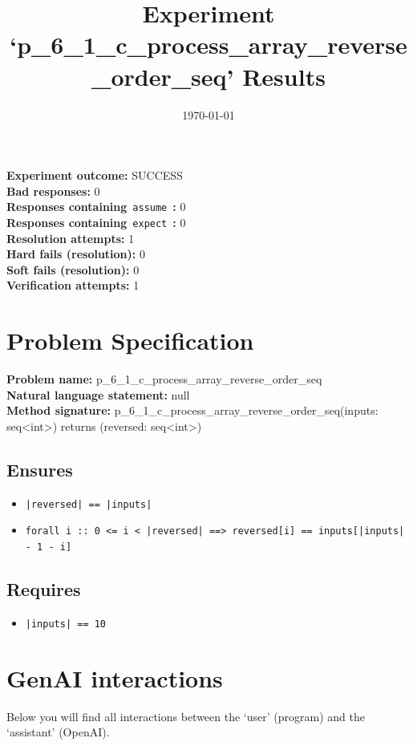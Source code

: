 \documentclass{article}
\begin{document}
\title{Experiment `p\_6\_1\_c\_process\_array\_reverse\_order\_seq' Results}
\author{\today}
\date{}
\maketitle
\textbf{Experiment outcome: }SUCCESS
\\\textbf{Bad responses: }0
\\\textbf{Responses containing}~\texttt{assume}~\textbf{: }0
\\\textbf{Responses containing}~\texttt{expect}~\textbf{: }0
\\\textbf{Resolution attempts: }1
\\\textbf{Hard fails (resolution): }0
\\\textbf{Soft fails (resolution): }0
\\\textbf{Verification attempts: }1
\section*{Problem Specification}
\textbf{Problem name: }p\_6\_1\_c\_process\_array\_reverse\_order\_seq
\\\textbf{Natural language statement: }null
\\\textbf{Method signature: }p\_6\_1\_c\_process\_array\_reverse\_order\_seq(inputs: seq<int>) returns (reversed: seq<int>)
\subsection*{Ensures}
\begin{itemize}
\item \texttt{|reversed| == |inputs|}
\item \texttt{forall i :: 0 <= i < |reversed| ==> reversed[i] == inputs[|inputs| - 1 - i]}
\end{itemize}
\subsection*{Requires}
\begin{itemize}
\item \texttt{|inputs| == 10}
\end{itemize}
\clearpage
\section*{GenAI interactions}
Below you will find all interactions between the `user' (program) and the `assistant' (OpenAI).
\end{document}

